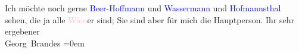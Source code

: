            \pstart
           Ich möchte noch gerne \textcolor{blue}{Beer-Hoffmann}{}\ledrightnote{\textcolor{blue}{Richard Beer-Hofmann}} und \textcolor{blue}{Wassermann}{}\ledrightnote{\textcolor{blue}{Jakob Wassermann}} und \textcolor{blue}{Hofmannsthal}{}\ledrightnote{\textcolor{blue}{Hugo von Hofmannsthal}} sehen, die ja alle \textcolor{pink}{Wien}{}\ledrightnote{\textcolor{pink}{Wien}}er sind; Sie sind aber für mich die Hauptperson.\pend
           \pstart
           Ihr sehr ergebener{\\[\baselineskip]}\spacefill\mbox{Georg Brandes}\pend
           \leftskip=0em{}\endnumbering{}  
      